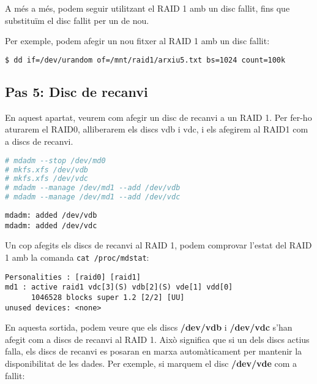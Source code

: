A més a més, podem seguir utilitzant el RAID 1 amb un disc fallit, fins que substituïm el disc fallit per un de nou.

Per exemple, podem afegir un nou fitxer al RAID 1 amb un disc fallit:

\begin{lstlisting}[language=bash, numbers=none, commentstyle=\color{black}]
$ dd if=/dev/urandom of=/mnt/raid1/arxiu5.txt bs=1024 count=100k
\end{lstlisting}


\subsection{Pas 5: Disc de recanvi}\label{pas-5-disc-de-recanvi}

En aquest apartat, veurem com afegir un disc de recanvi a un RAID 1. Per fer-ho aturarem el RAID0, alliberarem els discs vdb i vdc, i els afegirem al RAID1 com a discs de recanvi.

\begin{lstlisting}[language=bash, numbers=none, commentstyle=\color{black}]
# mdadm --stop /dev/md0
# mkfs.xfs /dev/vdb
# mkfs.xfs /dev/vdc
# mdadm --manage /dev/md1 --add /dev/vdb
# mdadm --manage /dev/md1 --add /dev/vdc
\end{lstlisting}

\begin{terminaloutput}
\footnotesize\begin{verbatim}
mdadm: added /dev/vdb
mdadm: added /dev/vdc
\end{verbatim}
\end{terminaloutput}

Un cop afegits els discs de recanvi al RAID 1, podem comprovar l'estat del RAID 1 amb la comanda \texttt{cat /proc/mdstat}:

\begin{terminaloutput}
\footnotesize\begin{verbatim}
Personalities : [raid0] [raid1]
md1 : active raid1 vdc[3](S) vdb[2](S) vde[1] vdd[0]
      1046528 blocks super 1.2 [2/2] [UU]
unused devices: <none>
\end{verbatim}
\end{terminaloutput}

En aquesta sortida, podem veure que els discs \textbf{/dev/vdb} i \textbf{/dev/vdc} s'han afegit com a discs de recanvi al RAID 1. Això significa que si un dels discs actius falla, els discs de recanvi es posaran en marxa automàticament per mantenir la disponibilitat de les dades. Per exemple, si marquem el disc \textbf{/dev/vde} com a fallit:

